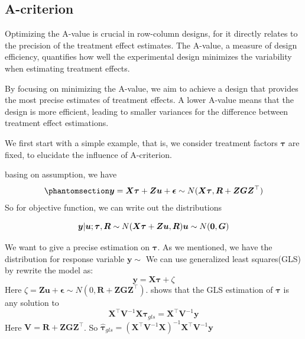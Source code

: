 \documentclass[
  a4paper,
  oneside,
  openany,
  12pt,
  onecolumn]{book}
\theoremstyle{plain}
\theoremstyle{definition}
\theoremstyle{remark}
\begin{document}
\subsection{A-criterion}\label{a-criterion}

Optimizing the A-value is crucial in row-column designs, for it directly
relates to the precision of the treatment effect estimates. The A-value,
a measure of design efficiency, quantifies how well the experimental
design minimizes the variability when estimating treatment effects.

By focusing on minimizing the A-value, we aim to achieve a design that
provides the most precise estimates of treatment effects. A lower
A-value means that the design is more efficient, leading to smaller
variances for the difference between treatment effect estimations.

We first start with a simple example, that is, we consider treatment
factors \(\boldsymbol{\tau}\) are fixed, to elucidate the influence of
A-criterion.

basing on assumption, we have
\begin{equation}\phantomsection\label{eq-asp}{
\boldsymbol{y}=\boldsymbol{X}\boldsymbol{\tau}+\boldsymbol{Z}\boldsymbol{u}+\boldsymbol{\epsilon}\sim N(\boldsymbol{X}\boldsymbol{\tau},\boldsymbol{R}+\boldsymbol{ZGZ}^\top)
}\end{equation} So for objective function, we can write out the
distributions

\[
\boldsymbol{y}|\boldsymbol{u};\boldsymbol{\tau},\boldsymbol{R}\sim N(\boldsymbol{X}\boldsymbol{\tau}+\boldsymbol{Z}\boldsymbol{u},\boldsymbol{R}) \\
\boldsymbol{u}\sim N(\boldsymbol{0},\boldsymbol{G})
\]

We want to give a precise estimation on \(\boldsymbol{\tau}\). As we
mentioned, we have the distribution for response variable
\(\boldsymbol{y}\sim\) We can use generalized least squares(GLS) by
rewrite the model as: \[
\boldsymbol{y} = \boldsymbol{X}\boldsymbol{\tau} + \zeta
\] Here
\(\zeta = \boldsymbol{Z}\boldsymbol{u}+\boldsymbol{\epsilon}\sim N(0, \boldsymbol{R}+\boldsymbol{Z}\boldsymbol{G}\boldsymbol{Z}^\top)\).
\citet{henderson1975best} shows that the GLS estimation of
\(\boldsymbol{\tau}\) is any solution to \[
\boldsymbol{X}^\top\boldsymbol{V}^{-1}\boldsymbol{X}\hat{\boldsymbol{\tau}}_{gls}=\boldsymbol{X}^\top\boldsymbol{V}^{-1}\boldsymbol{y}
\] Here
\(\boldsymbol{V}=\boldsymbol{R}+\boldsymbol{Z}\boldsymbol{G}\boldsymbol{Z}^\top\).
So
\(\hat{\boldsymbol{\tau}}_{gls} = (\boldsymbol{X}^\top\boldsymbol{V}^{-1}\boldsymbol{X})^{-1}\boldsymbol{X}^\top\boldsymbol{V}^{-1}\boldsymbol{y}\)
\end{document}
